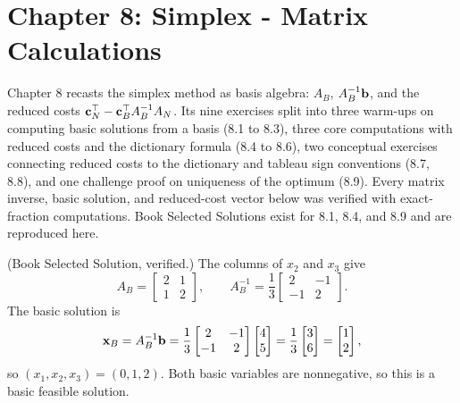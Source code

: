 \section{Chapter 8: Simplex - Matrix Calculations}

Chapter 8 recasts the simplex method as basis algebra: $A_B$, $A_B^{-1}\mathbf{b}$,
and the reduced costs $\mathbf{c}_N^\top - \mathbf{c}_B^\top A_B^{-1} A_N$. Its nine
exercises split into three warm-ups on computing basic solutions from a
basis (8.1 to 8.3), three core computations with reduced costs and the
dictionary formula (8.4 to 8.6), two conceptual exercises connecting
reduced costs to the dictionary and tableau sign conventions (8.7, 8.8),
and one challenge proof on uniqueness of the optimum (8.9). Every matrix
inverse, basic solution, and reduced-cost vector below was verified with
exact-fraction computations. Book Selected Solutions exist for 8.1, 8.4,
and 8.9 and are reproduced here.


(Book Selected Solution, verified.) The columns of $x_2$ and $x_3$ give
\[
A_B =
\begin{bmatrix}
2 & 1 \\
1 & 2
\end{bmatrix},
\qquad
A_B^{-1} = \frac{1}{3}
\begin{bmatrix}
2 & -1 \\
-1 & 2
\end{bmatrix}.
\]
The basic solution is
\[
\mathbf{x}_B = A_B^{-1}\mathbf{b} = \frac{1}{3}
\begin{bmatrix}
2 & -1 \\
-1 & 2
\end{bmatrix}
\begin{bmatrix}
4 \\ 5
\end{bmatrix}
= \frac{1}{3}
\begin{bmatrix}
3 \\ 6
\end{bmatrix}
=
\begin{bmatrix}
1 \\ 2
\end{bmatrix},
\]
so $(x_1, x_2, x_3) = (0, 1, 2)$. Both basic variables are nonnegative,
so this is a basic feasible solution.

